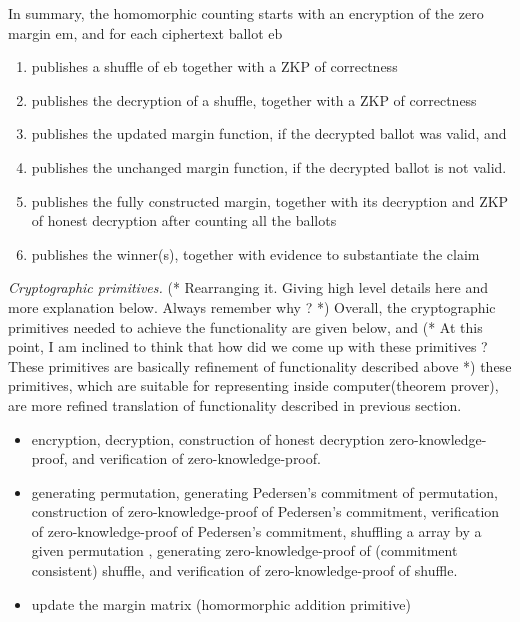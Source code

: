 \documentclass{llncs}
\newcommand{\encb}{\mathrm{eb}}
\newcommand{\encm}{\mathrm{em}}
\begin{document}
In summary, the homomorphic counting starts
with an encryption of the zero margin $\encm$, and for each
ciphertext ballot $\encb$
\begin{enumerate}
\item publishes a shuffle of $\encb$ together with a ZKP of 
correctness
\item publishes the decryption of a shuffle, together with a ZKP of
correctness
\item publishes the updated margin function, if the decrypted ballot
was valid, and
\item publishes the unchanged margin function, if the decrypted
ballot is not valid.
\item publishes the fully constructed margin, together with its decryption  
  and ZKP of honest decryption after counting all the ballots     
\item publishes the winner(s), together with evidence to substantiate the
    claim
\end{enumerate}


\smallskip\noindent\emph{Cryptographic primitives.}
(* Rearranging it. Giving high level details here and more 
   explanation below. Always remember why ? *) 
 Overall, the cryptographic primitives needed to achieve the functionality
 are given below, and (* At this point, I am inclined to think that how did 
 we come up with these primitives ? These primitives are basically 
 refinement of functionality described above *) these primitives, 
 which are suitable for representing inside computer(theorem prover),
 are more refined translation of functionality
 described in previous section.
 
\begin{itemize} 
\item encryption, decryption, construction of honest decryption
     zero-knowledge-proof, and verification of zero-knowledge-proof. 
\item generating permutation, generating  Pedersen's 
     commitment \cite{Pederson} of permutation, construction of 
     zero-knowledge-proof of Pedersen's commitment, verification of 
     zero-knowledge-proof of Pedersen's commitment, shuffling a array 
     by a given permutation \cite{Wikstrom:2009:CPS}, 
     generating zero-knowledge-proof of (commitment consistent) shuffle, 
     and verification of zero-knowledge-proof of shuffle.
\item  update the margin matrix (homormorphic addition primitive)
\end{itemize}
  
\end{document}
